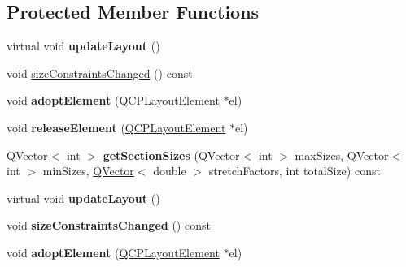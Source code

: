 \subsection*{Protected Member Functions}
\begin{DoxyCompactItemize}
\item 
virtual void {\bfseries update\+Layout} ()\hypertarget{class_q_c_p_layout_a165c77f6287ac92e8d03017ad913378b}{}\label{class_q_c_p_layout_a165c77f6287ac92e8d03017ad913378b}

\item 
void \hyperlink{class_q_c_p_layout_a6218cd7e5c0e30077c1aeaffe55b6145}{size\+Constraints\+Changed} () const 
\item 
void {\bfseries adopt\+Element} (\hyperlink{class_q_c_p_layout_element}{Q\+C\+P\+Layout\+Element} $\ast$el)\hypertarget{class_q_c_p_layout_af6dbbc24156a808da29cd1ec031729a3}{}\label{class_q_c_p_layout_af6dbbc24156a808da29cd1ec031729a3}

\item 
void {\bfseries release\+Element} (\hyperlink{class_q_c_p_layout_element}{Q\+C\+P\+Layout\+Element} $\ast$el)\hypertarget{class_q_c_p_layout_a4afbb4bef0071f72f91afdac4433a18e}{}\label{class_q_c_p_layout_a4afbb4bef0071f72f91afdac4433a18e}

\item 
\hyperlink{class_q_vector}{Q\+Vector}$<$ int $>$ {\bfseries get\+Section\+Sizes} (\hyperlink{class_q_vector}{Q\+Vector}$<$ int $>$ max\+Sizes, \hyperlink{class_q_vector}{Q\+Vector}$<$ int $>$ min\+Sizes, \hyperlink{class_q_vector}{Q\+Vector}$<$ double $>$ stretch\+Factors, int total\+Size) const \hypertarget{class_q_c_p_layout_a92d9dcd95e9510b323706ef7fc4ff62e}{}\label{class_q_c_p_layout_a92d9dcd95e9510b323706ef7fc4ff62e}

\item 
virtual void {\bfseries update\+Layout} ()\hypertarget{class_q_c_p_layout_afbc3f7cf3fc41baacd58391bb2086ea8}{}\label{class_q_c_p_layout_afbc3f7cf3fc41baacd58391bb2086ea8}

\item 
void {\bfseries size\+Constraints\+Changed} () const \hypertarget{class_q_c_p_layout_a6218cd7e5c0e30077c1aeaffe55b6145}{}\label{class_q_c_p_layout_a6218cd7e5c0e30077c1aeaffe55b6145}

\item 
void {\bfseries adopt\+Element} (\hyperlink{class_q_c_p_layout_element}{Q\+C\+P\+Layout\+Element} $\ast$el)\hypertarget{class_q_c_p_layout_af6dbbc24156a808da29cd1ec031729a3}{}\label{class_q_c_p_layout_af6dbbc24156a808da29cd1ec031729a3}


\end{DoxyCompactItemize}
